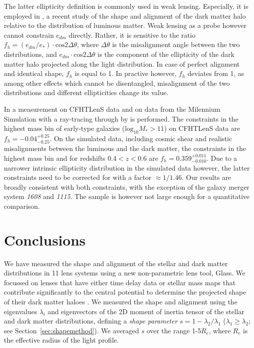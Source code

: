 \documentclass[useAMS,usenatbib]{mn2e}
\def\Glass{{\sc Glass}}
\begin{document}
The latter ellipticity definition is commonly used in weak lensing. Especially, it is employed in \citet{2015arXiv150704301S}, a recent study of the shape and alignment of the dark matter halo relative to the distribution of luminous matter. Weak lensing as a probe however cannot constrain $e_{dm}$ directly. Rather, it is sensitive to the ratio $f_{h} = (e_{dm}/e_{*})\cdot\mathrm{cos} 2\Delta\theta$, where $\Delta\theta$ is the misalignment angle between the two distributions, and $e_{dm}\cdot\mathrm{cos} 2\Delta\theta$ is the component of the ellipticity of the dark matter halo projected along the light distribution. In case of perfect alignment and identical shape, $f_{h}$ is equal to 1. In practive however, $f_{h}$ deviates from 1, as among other effects which cannot be disentangled, misalignment of the two distributions and different ellipticities change its value.

In \citet{2015arXiv150704301S} a measurement on CFHTLenS data and on data from the Milennium Simulation \citep{2005Natur.435..629S} with a ray-tracing through by \citet{2009A&A...499...31H} is performed. The constraints in the highest mass bin of early-type galaxies ($\mathrm{log_{10}}M_{*}>11$) on CFHTLenS data are $f_{h}=-0.04^{+0.25}_{-0.25}$. On the simulated data, including cosmic shear and realistic misalignments between the luminous and the dark matter, the constraints in the highest mass bin and for redshifts $0.4<z<0.6$ are $f_{h} = 0.359^{+0.011}_{-0.010}$. Due to a narrower intrinsic ellipticity distribution in the simulated data however, the latter constraints need to be corrected for with a factor $\approx 1/1.46$. Our results are broadly consistent with both constraints, with the exception of the galaxy merger system \textit{1608} and \textit{1115}. The sample is however not large enough for a quantitative comparison.


\section{Conclusions}\label{sec:conclusions}
We have measured the shape and alignment of the stellar and dark matter distributions in 11 lens systems using a new non-parametric lens tool, \Glass. We focussed on lenses that have either time delay data or stellar mass maps that contribute significantly to the central potential to determine the projected shape of their dark matter haloes \citep{2014MNRAS.445.2181C}. We measured the shape and alignment using the eigenvalues $\lambda_i$ and eigenvectors of the 2D moment of inertia tensor of the stellar and dark matter distributions, defining a {\it shape parameter} $s = 1 - \lambda_{2}/\lambda_{1}$ ($\lambda_{1} \geq \lambda_{2}$; see Section~\ref{sec:shapemethod}). We averaged $s$ over the range 1-5$R_e$, where $R_e$ is the effective radius of the light profile.
\end{document}
